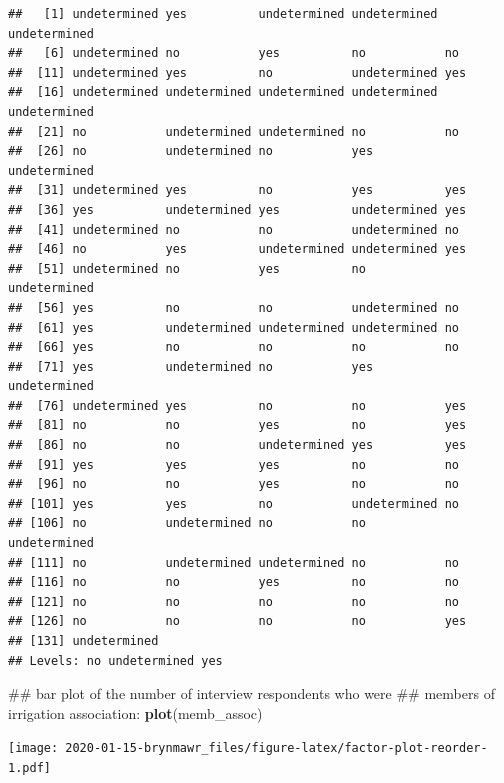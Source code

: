\documentclass[]{book}
\newenvironment{Shaded}{\begin{snugshade}}{\end{snugshade}}
\newcommand{\KeywordTok}[1]{\textcolor[rgb]{0.13,0.29,0.53}{\textbf{#1}}}
\newcommand{\NormalTok}[1]{#1}
\begin{document}
\begin{verbatim}
##   [1] undetermined yes          undetermined undetermined undetermined
##   [6] undetermined no           yes          no           no          
##  [11] undetermined yes          no           undetermined yes         
##  [16] undetermined undetermined undetermined undetermined undetermined
##  [21] no           undetermined undetermined no           no          
##  [26] no           undetermined no           yes          undetermined
##  [31] undetermined yes          no           yes          yes         
##  [36] yes          undetermined yes          undetermined yes         
##  [41] undetermined no           no           undetermined no          
##  [46] no           yes          undetermined undetermined yes         
##  [51] undetermined no           yes          no           undetermined
##  [56] yes          no           no           undetermined no          
##  [61] yes          undetermined undetermined undetermined no          
##  [66] yes          no           no           no           no          
##  [71] yes          undetermined no           yes          undetermined
##  [76] undetermined yes          no           no           yes         
##  [81] no           no           yes          no           yes         
##  [86] no           no           undetermined yes          yes         
##  [91] yes          yes          yes          no           no          
##  [96] no           no           yes          no           no          
## [101] yes          yes          no           undetermined no          
## [106] no           undetermined no           no           undetermined
## [111] no           undetermined undetermined no           no          
## [116] no           no           yes          no           no          
## [121] no           no           no           no           no          
## [126] no           no           no           no           yes         
## [131] undetermined
## Levels: no undetermined yes
\end{verbatim}

\begin{Shaded}
\begin{Highlighting}[]
\NormalTok{## bar plot of the number of interview respondents who were}
\NormalTok{## members of irrigation association:}
\KeywordTok{plot}\NormalTok{(memb_assoc)}
\end{Highlighting}
\end{Shaded}

\texttt{[image: 2020-01-15-brynmawr\_files/figure-latex/factor-plot-reorder-1.pdf]}
\end{document}
